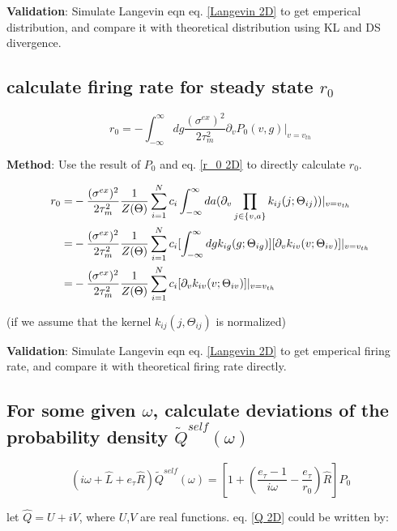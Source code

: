 \documentclass{article}
\begin{document}
	\textbf{Validation}: Simulate Langevin eqn eq. \eqref{Langevin 2D} to get emperical distribution, and compare it with theoretical distribution using KL and DS divergence.
	
	\subsection{calculate firing rate for steady state $r_0$}\label{sec:r_0}
	
	\begin{equation}
		r_0=-\int_{-\infty}^{\infty}dg\frac{(\sigma^{ex})^2}{2\tau_m^2}\partial_{v}P_0(v,g)|_{v=v_{th}}
		\label{r_0 2D}
	\end{equation}

	\textbf{Method}: Use the result of $P_0$ and eq. \eqref{r_0 2D} to directly calculate $r_0$.
	
	\begin{align}
		r_0=&-\frac{(\sigma^{ex})^2}{2\tau_m^2}\frac{1}{Z(\Theta)}\sum_{i=1}^{N}c_i\int_{-\infty}^{\infty}da(\partial_{v}\prod_{j\in\{v,a\}}k_{ij}(j;\Theta_{ij}))|_{v=v_{th}}\notag\\
		=&-\frac{(\sigma^{ex})^2}{2\tau_m^2}\frac{1}{Z(\Theta)}\sum_{i=1}^{N}c_i[\int_{-\infty}^{\infty}dgk_{ig}(g;\Theta_{ig})][\partial_{v}k_{iv}(v;\Theta_{iv})]|_{v=v_{th}}\notag\\
     	=&-\frac{(\sigma^{ex})^2}{2\tau_m^2}\frac{1}{Z(\Theta)}\sum_{i=1}^{N}c_i[\partial_{v}k_{iv}(v;\Theta_{iv})]|_{v=v_{th}}
	\end{align}
	
	(if we assume that the kernel $k_{ij}(j,\Theta_{ij})$ is normalized)
	
	\textbf{Validation}: Simulate Langevin eqn eq. \eqref{Langevin 2D} to get emperical firing rate, and compare it with theoretical firing rate directly.
	\subsection{For some given $\omega$, calculate deviations of the probability density $\tilde{Q}^{self}(\omega)$}
	
	\begin{equation}
		(i\omega+\hat{L}+e_\tau\hat{R})\tilde{Q}^{self}(\omega)=[1+(\frac{e_\tau-1}{i\omega}-\frac{e_\tau}{r_0})\hat{R}]P_0
		\label{Q 2D}
	\end{equation}
	
	let $\hat{Q}=U+iV$, where $U$,$V$ are real functions. eq. \eqref{Q 2D} could be written by:
	
\end{document}
